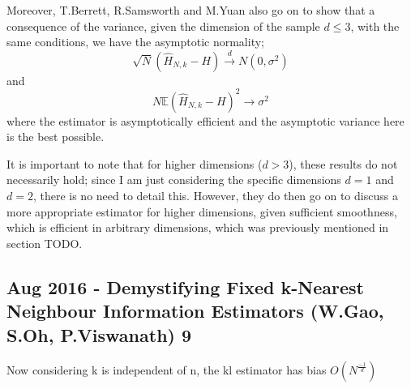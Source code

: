\documentclass{article}
\begin{document}
Moreover, T.Berrett, R.Samsworth and M.Yuan also go on to show that a consequence of the variance, given the dimension of the sample $d \leq 3$, with the same conditions, we have the asymptotic normality;
\begin{equation}
\sqrt{N}(\hat{H}_{N, k} - H) \xrightarrow{d} N(0, \sigma^2)
\end{equation}
and 
\begin{equation} 
N \mathbb{E}{(\hat{H}_{N, k} - H)^2} \xrightarrow{} \sigma^2
\end{equation}
where the estimator is asymptotically efficient and the asymptotic variance here is the best possible.

It is important to note that for higher dimensions ($d > 3$), these results do not necessarily hold; since I am just considering the specific dimensions $d=1$ and $d=2$, there is no need to detail this. However, they do then go on to discuss a more appropriate estimator for higher dimensions, given sufficient smoothness, which is efficient in arbitrary dimensions, which was previously mentioned in section TODO.


\subsection{Aug 2016 - Demystifying Fixed k-Nearest Neighbour Information Estimators (W.Gao, S.Oh, P.Viswanath) 9}

Now considering k is independent of n, the kl estimator has bias  $O(N^{\frac{-1}{d}})$
\end{document}
